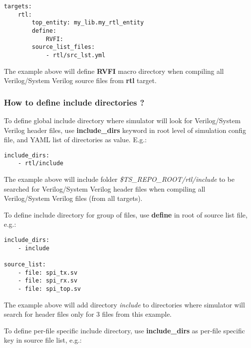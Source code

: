 \documentclass{tropic_design_spec}
\begin{document}
\begin{lstlisting}
targets:
    rtl:
        top_entity: my_lib.my_rtl_entity
        define:
            RVFI:
        source_list_files:
            - rtl/src_lst.yml
\end{lstlisting}

The example above will define \textbf{RVFI} macro directory when
compiling all Verilog/System Verilog source files from \textbf{rtl} target.



\subsubsection{How to define include directories ?}
\label{sec:how-to-define-include-directories}

To define global include directory where simulator will look for Verilog/System 
Verilog header files, use \textbf{include_dirs} keyword in root level of simulation config
file, and YAML list of directories as value. E.g.:

\begin{lstlisting}
include_dirs:
    - rtl/include
\end{lstlisting}

The example above will include folder \textit{\$TS_REPO_ROOT/rtl/include} to be searched
for Verilog/System Verilog header files when compiling all Verilog/System Verilog files
(from all targets).

To define include directory for group of files, use \textbf{define} in root of source
list file, e.g.:

\begin{lstlisting}
include_dirs:
    - include

source_list:
    - file: spi_tx.sv
    - file: spi_rx.sv
    - file: spi_top.sv
\end{lstlisting}

The example above will add directory \textit{include} to directories where simulator
will search for header files only for 3 files from this example.

To define per-file specific include directory, use \textbf{include_dirs} as per-file
specific key in source file list, e.g.:
\end{document}
